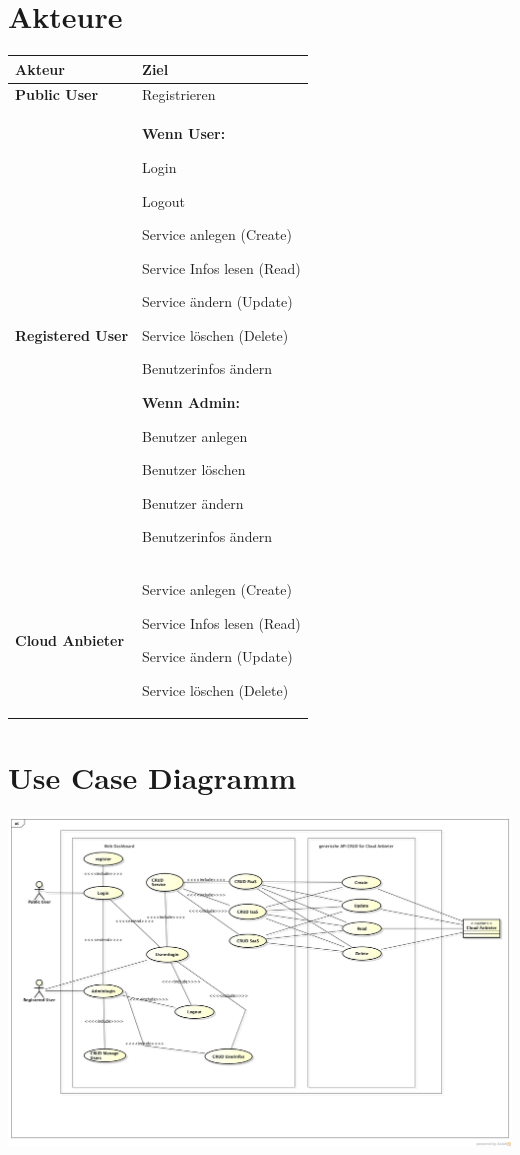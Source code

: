 \newpage
\section{Akteure}
\begin{tabularx}{\linewidth}{X X}
\textbf{Akteur} & \textbf{Ziel}\\
\hline
\textbf{Public User} &
Registrieren
\\
\hline
\textbf{Registered User} & 
\textbf{Wenn User:}

Login

Logout

Service anlegen (Create)

Service Infos lesen (Read)

Service ändern (Update)

Service löschen (Delete)

Benutzerinfos ändern

\textbf{Wenn Admin:}

Benutzer anlegen

Benutzer löschen

Benutzer ändern

Benutzerinfos ändern

\\
\hline
\textbf{Cloud Anbieter} &
Service anlegen (Create)

Service Infos lesen (Read)

Service ändern (Update)

Service löschen (Delete)
\\

\end{tabularx}


\section{Use Case Diagramm}

\includegraphics[width=\textwidth]{./03_Analyse/04_UseCases/images/UseCase-Skizzen}


